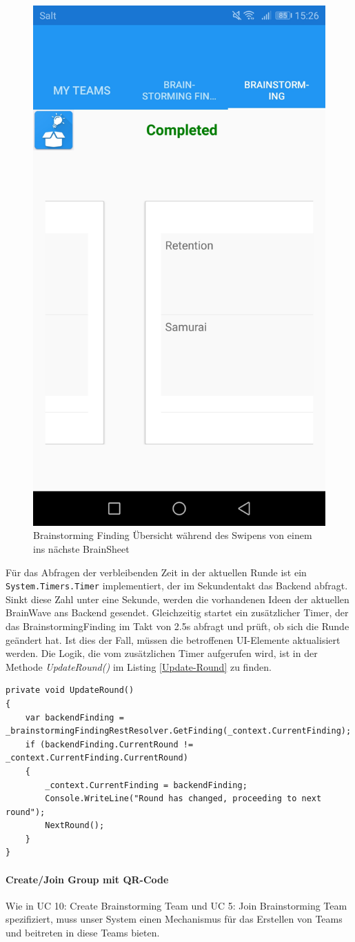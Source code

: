 \begin{figure}[h]
	\centering
	\includegraphics[width=0.4\linewidth,height=0.4\textheight,keepaspectratio]{img/techn-bericht/brainstorming-overview}
	\caption{Brainstorming Finding Übersicht während des Swipens von einem ins nächste BrainSheet}
	\label{fig:brainstorming-overview}
\end{figure}
\newpage
Für das Abfragen der verbleibenden Zeit in der aktuellen Runde ist ein \texttt{System.{\-}Timers.Timer} implementiert, der im Sekundentakt das Backend abfragt. Sinkt diese Zahl unter eine Sekunde, werden die vorhandenen Ideen der aktuellen BrainWave ans Backend gesendet. Gleichzeitig startet ein zusätzlicher Timer, der das BrainstormingFinding im Takt von 2.5s abfragt und prüft, ob sich die Runde geändert hat. Ist dies der Fall, müssen die betroffenen UI-Elemente aktualisiert werden. Die Logik, die vom zusätzlichen Timer aufgerufen wird, ist in der Methode \textit{UpdateRound()} im Listing \ref{Update-Round} zu finden.


\begin{lstlisting}[label=Update-Round,caption=Poll-Mechanismus um zu prüfen ob Runde gewechselt hat]
private void UpdateRound()
{
	var backendFinding = _brainstormingFindingRestResolver.GetFinding(_context.CurrentFinding);
	if (backendFinding.CurrentRound != _context.CurrentFinding.CurrentRound)
	{
		_context.CurrentFinding = backendFinding;
		Console.WriteLine("Round has changed, proceeding to next round");
		NextRound();
	}
}
\end{lstlisting}


\paragraph*{Create/Join Group mit QR-Code}
Wie in UC 10: Create Brainstorming Team und UC 5: Join Brainstorming Team spezifiziert, muss unser System einen Mechanismus für das Erstellen von Teams und beitreten in diese Teams bieten. 

